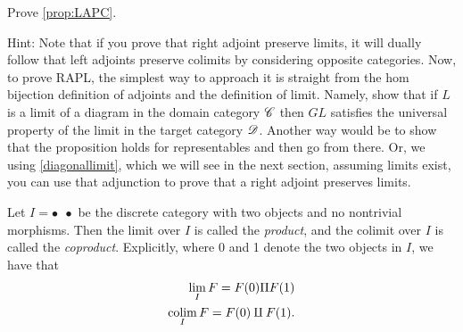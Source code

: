 \documentclass{article}[11pt]
\renewcommand{\dot}{\bullet }
\begin{document}
\begin{exercise}
Prove \autoref{prop:LAPC}.

 Hint: Note that if you prove that right adjoint preserve limits, it will dually follow that left adjoints preserve colimits by considering opposite categories. Now, to prove RAPL, the simplest way to approach it is straight from the hom bijection definition of adjoints and the definition of limit. Namely, show that if $L$ is a limit of a diagram in the domain category $\mathscr{C}$ then $GL$ satisfies the universal property of the limit in the target category $\mathscr{D}$. Another way would be to show that the proposition holds for representables and then go from there. Or, we using \autoref{diagonallimit}, which we will see in the next section, assuming limits exist, you can use that adjunction to prove that a right adjoint preserves limits.
\end{exercise}


\begin{definition} Let $I = \dot \ \  \dot$ be the discrete category with two objects and no nontrivial morphisms. Then the limit over $I$ is called the \textit{product}, and the colimit over $I$ is called the \textit{coproduct}. Explicitly, where 0 and 1 denote the two objects in $I$, we have that
\begin{align*}
	\lim_I F = F(0) \Pi  F(1) \\
	\mathop{\operatorname*{colim}}_I F = F(0) \amalg F(1).
\end{align*}
\end{definition}
\end{document}

